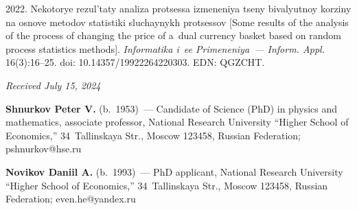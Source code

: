 \begin{multicols}{2}
{{\begin{thebibliography}{9}
 2022. 
Ne\-ko\-to\-rye re\-zul'\-ta\-ty ana\-li\-za pro\-tses\-sa iz\-me\-ne\-niya tse\-ny bi\-va\-lyut\-noy kor\-zi\-ny na osno\-ve me\-to\-dov 
sta\-ti\-sti\-ki slu\-chay\-nykh pro\-tses\-sov 
[Some results of the analysis of the process of changing the price of a~dual currency basket based on random process statistics methods].
\textit{Informatika i~ee Primeneniya~--- Inform. Appl.} 16(3):16--25.
doi: 10.14357/19922264220303. EDN: QGZCHT.


\end{thebibliography}

 }
 }

\end{multicols}

\vspace*{-6pt}

\hfill{\small\textit{Received July 15, 2024}} 

\vspace*{-18pt}

\Contr

\vspace*{-6pt}

\noindent
\textbf{Shnurkov Peter V.} (b.\ 1953)~--- Candidate of Science (PhD) in physics 
and mathematics, associate professor, National Research University ``Higher 
School of Economics,'' 34~Tallinskaya Str., Moscow 123458, Russian Federation; \mbox{pshnurkov@hse.ru}

\vspace*{3pt}

\noindent
\textbf{Novikov Daniil A.} (b.\ 1993)~--- PhD applicant, National Research 
University ``Higher School of Economics,'' 34~Tallinskaya Str., Moscow 123458, 
Russian Federation; \mbox{even.he@yandex.ru}



\label{end\stat}

\renewcommand{\bibname}{\protect\rm Литература} 